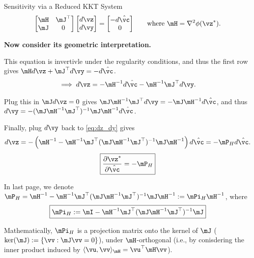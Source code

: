 \documentclass[10pt,aspectratio=169,xcolor=dvipsnames]{beamer}
\begin{document}
\begin{frame}[allowframebreaks]{Sensitivity via a Reduced KKT System}
\begin{equation}
{            \begin{bmatrix}
                \mH & \mJ^\top\\
                \mJ & 0
            \end{bmatrix}
            \begin{bmatrix}
                d\vz\\
                d\vy
            \end{bmatrix}
            =
            \begin{bmatrix}
                -d\hat{\vc}\\
                0
            \end{bmatrix}
        } \qquad \text{where } \mH = \nabla^2 \phi(\vz^*).
    \end{equation}

    \textbf{Now consider its geometric interpretation.}

    This equation is invertivle under the regularity conditions, and thus the first row gives $\mH d\vz + \mJ^\top d\vy = -d\hat{\vc}$.
    \begin{equation}\label{eq:dz_dy}
        \implies d\vz = -\mH^{-1} d\hat{\vc} - \mH^{-1} \mJ^\top d\vy.
    \end{equation}


    Plug this in $\mJ d\vz = 0$ gives $\mJ \mH^{-1} \mJ^\top d\vy = -\mJ \mH^{-1} d\hat{\vc}$, and thus $d\vy = -(\mJ \mH^{-1} \mJ^\top)^{-1} \mJ \mH^{-1} d\hat{\vc}$.

    Finally, plug $d\vy$ back to \eqref{eq:dz_dy} gives
    \begin{equation}\label{eq:dz_dhatc_final}
        d\vz = -\left( \mH^{-1} - \mH^{-1} \mJ^\top (\mJ \mH^{-1} \mJ^\top)^{-1} \mJ \mH^{-1} \right) d\hat{\vc} = -\mP_H d\hat{\vc}.
    \end{equation}
    \begin{equation}\label{eq:dz_dhatc}
        \boxed{\frac{\partial \vz^*}{\partial \hat{\vc}} = -\mP_H}
    \end{equation}

    \break

    In last page, we denote $\mP_H = \mH^{-1} - \mH^{-1} \mJ^\top (\mJ \mH^{-1} \mJ^\top)^{-1} \mJ \mH^{-1} := \mPi_H \mH^{-1}$, where
    \begin{equation}
        \boxed{\mPi_H := \mI - \mH^{-1} \mJ^\top (\mJ \mH^{-1} \mJ^\top)^{-1} \mJ}
    \end{equation}

    Mathematically, $\mPi_H$ is a projection matrix onto the kernel of $\mJ$ ($\ker(\mJ) := \{\vv : \mJ \vv = 0\}$), under $\mH$-orthogonal (i.e., by conisdering the inner product induced by $\langle \vu,\vv\rangle_{\mH} = \vu^\top \mH \vv$).


\end{frame}
\end{document}
